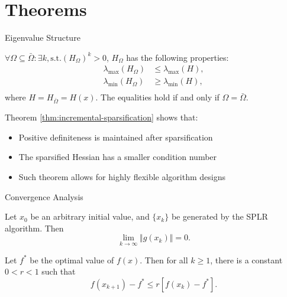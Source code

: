 \section{Theorems}
\begin{frame}{Eigenvalue Structure}
    \begin{theorem}
    \label{thm:incremental-sparsification}
        $\forall \Omega \subseteq \bar{\Omega}: \exists k, \text{s.t.}(H_{\Omega})^k > 0$, $H_{\Omega}$ has the following properties:
        \begin{equation*}
            \begin{aligned}
                \lambda_{\max}(H_{\Omega}) &\leq \lambda_{\max}(H), \\
                \lambda_{\min}(H_{\Omega}) &\geq \lambda_{\min}(H), \\
            \end{aligned}   
        \end{equation*}
        where $H = H_{\bar{\Omega}} = H(x)$. The equalities hold if and only if $\Omega = \bar{\Omega}$.
    \end{theorem}

    Theorem \ref{thm:incremental-sparsification} shows that:
    \begin{itemize}
        \item Positive definiteness is maintained after sparsification
        \item The sparsified Hessian has a smaller condition number
        \item Such theorem allows for highly flexible algorithm designs
    \end{itemize}
\end{frame}

\begin{frame}{Convergence Analysis}
    \begin{theorem}
         \label{thm:global_convergence}
        Let $x_0$ be an arbitrary initial value, and $\{x_k\}$ be generated by the SPLR algorithm. Then
        \[
        \lim_{k\rightarrow\infty} \Vert g(x_k) \Vert = 0.
        \]   
    \end{theorem}
    
    \begin{theorem}
    \label{thm:linear_convergence}
    Let $f^*$ be the optimal value of $f(x)$. Then for all $k\ge 1$, there is a constant $0<r<1$ such that
    \[
    f(x_{k+1})-f^*\le r[f(x_k)-f^*].
    \]
    \end{theorem}
\end{frame}